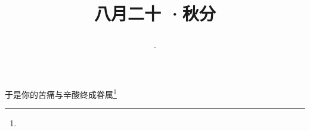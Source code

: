\title{\date[d=22,m=9,y=2024][year:cn-y,年,month:cn,day:cn,日,·,weekday]·八月二十 ·秋分}
于是你的苦痛与辛酸终成眷属\footnote{ }

